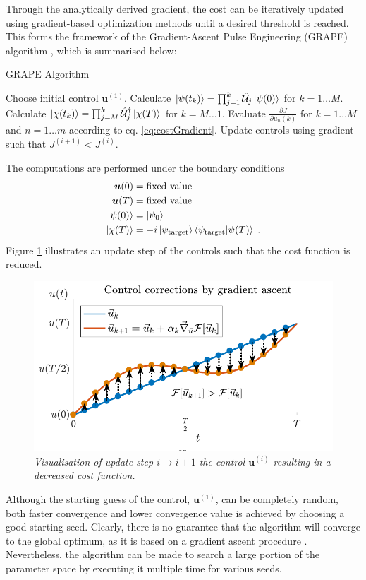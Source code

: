 Through the analytically derived gradient, the cost can be iteratively updated using gradient-based optimization methods until a desired threshold is reached. This forms the framework of the Gradient-Ascent Pulse Engineering (GRAPE) algorithm \cite{Khaneja2005}, which is summarised below:

\begin{algorithm}
\begin{algorithmic}
\caption{GRAPE Algorithm}
\State Choose initial control $\boldsymbol{u}^{(1)}$.
	\State Calculate $\ket{\psi (t_k)} = \prod_{j=1}^{k} \hat{\mathcal{U}}_j \ket{\psi (0)}$ for $k = 1 \ldots M$.
	\State Calculate $\ket{\chi (t_k)} = \prod_{j=M}^{k} \hat{\mathcal{U}}_{j}^{\dag} \ket{\chi (T)}$ for $k = M \ldots 1$. 
	\State Evaluate $\frac{\partial J}{\partial u_n (k)}$ for $k = 1 \ldots M$ and $n = 1 \ldots m$ according to eq. \eqref{eq:costGradient}.
	\State Update controls using gradient such that $J^{(i + 1)} < J^{(i)}$. 
\EndWhile
\end{algorithmic}
\end{algorithm}
The computations are performed under the boundary conditions
\begin{align}
	\boldsymbol{u}(0) &= \text{fixed value} \\
	\boldsymbol{u}(T) &= \text{fixed value} \\
	\ket{\psi (0)} &= \ket{\psi_0} \\
	\ket{\chi (T)} &= -i \ket{\psi_{\mathrm{target}}} \braket{\psi_{\mathrm{target}} | \psi (T)} \; .
\end{align}
Figure \ref{fig:ControlUpdate} illustrates an update step of the controls such that the cost function is reduced.
\begin{figure}[!h]
	\centering
	\includegraphics[width=0.7\columnwidth]{Figures/ControlUpdate.pdf} 
	\caption{ \textit{Visualisation of update step $i \to i+1$ the control $\boldsymbol{u}^{(i)}$ resulting in a decreased cost function.}}
	\label{fig:ControlUpdate} 
\end{figure} 
Although the starting guess of the control, $\boldsymbol{u}^{(1)}$, can be completely random, both faster convergence and lower convergence value is achieved by choosing a good starting seed. Clearly, there is no guarantee that the algorithm will converge to the global optimum, as it is based on a gradient ascent procedure \cite{Khaneja2005}. Nevertheless, the algorithm can be made to search a large portion of the parameter space by executing it multiple time for various seeds.  


